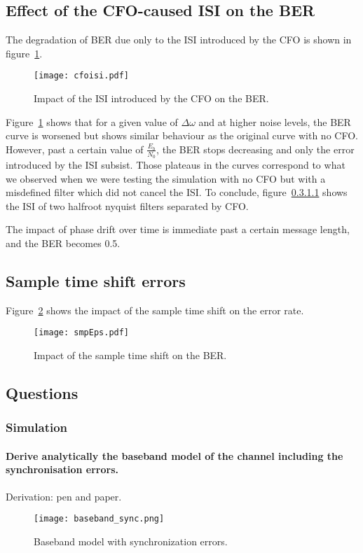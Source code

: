 \subsection{Effect of the CFO-caused ISI on the BER}
The degradation of BER due only to the ISI introduced by the CFO is shown in figure~\ref{fig:cfoisi}.
\begin{figure}[htbp]
\centering
\texttt{[image: cfoisi.pdf]}
\caption{Impact of the ISI introduced by the CFO on the BER.\label{fig:cfoisi}}
\end{figure}
Figure~\ref{fig:cfoisi} shows that for a given value of $\Delta\omega$ and at higher noise levels, the BER curve is worsened but shows similar behaviour as the original curve with no CFO.
However, past a certain value of $\frac{E_b}{N_0}$, the BER stops decreasing and only the error introduced by the ISI subsist.
Those plateaus in the curves correspond to what we observed when we were testing the simulation with no CFO but with a misdefined filter which did not cancel the ISI.
To conclude, figure~\ref{} shows the ISI of two halfroot nyquist filters separated by CFO.



The impact of phase drift over time is immediate past a certain message length, and the BER becomes 0.5.

\subsection{Sample time shift errors}
Figure~\ref{fig:smpEps} shows the impact of the sample time shift on the error rate.
\begin{figure}[htbp]
\centering
\texttt{[image: smpEps.pdf]}
\caption{Impact of the sample time shift on the BER.\label{fig:smpEps}}
\end{figure}

\subsection{Questions}
\subsubsection{Simulation}

\paragraph{Derive analytically the baseband model of the channel including the synchronisation errors.}
Derivation: pen and paper.
\begin{figure}[htbp]
\texttt{[image: baseband\_sync.png]}
\caption{Baseband model with synchronization errors.\label{fig:sync}}
\end{figure}


